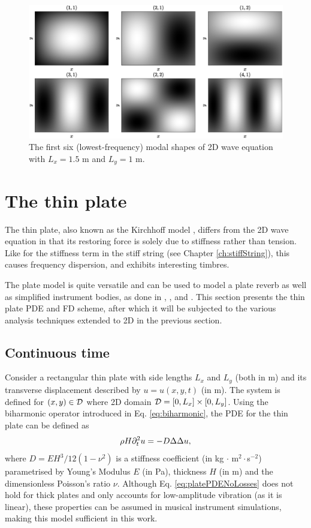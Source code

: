 \begin{figure}[h]
    \centering
    \includegraphics[width=\textwidth]{figures/resonators/2d/modalShapes.eps}
    \caption{The first six (lowest-frequency) modal shapes of 2D wave equation with $L_x = 1.5$ m and $L_y = 1$ m.%
    \label{fig:modalShapes2D}}
\end{figure}

\section{The thin plate}\label{sec:thinPlate}
The thin plate, also known as the Kirchhoff model \cite{Kirchhoff1968}, differs from the 2D wave equation in that its restoring force is solely due to stiffness rather than tension. Like for the stiffness term in the stiff string (see Chapter \ref{ch:stiffString}), this causes frequency dispersion, and exhibits interesting timbres. 

The plate model is quite versatile and can be used to model a plate reverb \cite{DAFxChapter} as well as simplified instrument bodies, as done in \citeP[A], \citeP[B], \citeP[D] and \citeP[E]. This section presents the thin plate PDE and FD scheme, after which it will be subjected to the various analysis techniques extended to 2D in the previous section.

\subsection{Continuous time}
Consider a rectangular thin plate with side lengths $L_x$ and $L_y$ (both in m) and its transverse displacement described by $u=u(x,y,t)$ (in m). The system is defined for $(x,y)\in \mathcal{D}$ where 2D domain $\mathcal{D} = [0, L_x]\times [0, L_y]$. Using the biharmonic operator introduced in Eq. \eqref{eq:biharmonic}, the PDE for the thin plate can be defined as \cite{Kirchhoff1968}
\begin{equation}\label{eq:platePDENoLosses}
    \rho H \partial_t^2 u = -D\Delta\Delta u,
\end{equation}
where $D = EH^3/12(1-\nu^2)$ is a stiffness coefficient (in kg $\cdot$ m$^2\cdot$s$^{-2}$) parametrised by Young's Modulus $E$ (in Pa), thickness $H$ (in m) and the dimensionless Poisson's ratio $\nu$. Although Eq. \eqref{eq:platePDENoLosses} does not hold for thick plates and only accounts for low-amplitude vibration (as it is linear), these properties can be assumed in musical instrument simulations, making this model sufficient in this work. 

